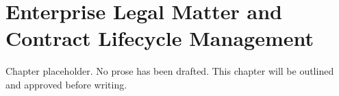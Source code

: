 \chapter{Enterprise Legal Matter and Contract Lifecycle Management}
\begin{notebox}
Chapter placeholder. No prose has been drafted. This chapter will be outlined and approved before writing.
\end{notebox}
